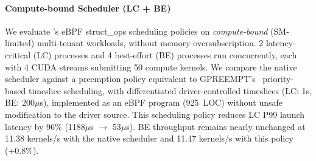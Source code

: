 \paragraph{Compute-bound Scheduler (LC + BE)}
We evaluate \sys's eBPF struct\_ops scheduling policies on \emph{compute-bound} (SM-limited) multi-tenant workloads, without memory oversubscription.
2 latency-critical (LC) processes and 4 best-effort (BE) processes run concurrently, each with 4 CUDA streams submitting 50 compute kernels.
We compare the native scheduler against a \sys{} preemption policy equivalent to GPREEMPT's~\cite{fan2025gpreempt} priority-based timeslice scheduling, with differentiated driver-controlled timeslices (LC: 1s, BE: 200$\mu$s), implemented as an eBPF program (925~LOC) without unsafe modification to the driver source.
This scheduling policy reduces LC P99 launch latency by 96\% (1188$\mu$s $\to$ 53$\mu$s).
BE throughput remains nearly unchanged at 11.38 kernels/s with the native scheduler and 11.47 kernels/s with this policy (+0.8\%).

%

